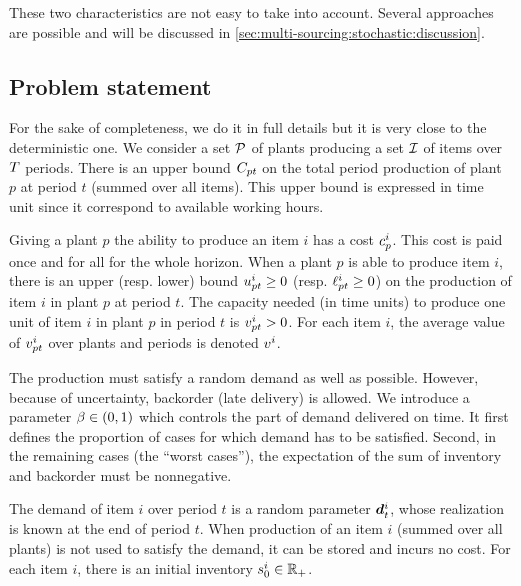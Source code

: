 These two characteristics are not easy to take into account.
Several approaches are possible and will be discussed in \cref{sec:multi-sourcing:stochastic:discussion}.



\subsection{Problem statement}
\label{sec:multi-sourcing:stochastic:introduction:problem-statement}


For the sake of completeness, we do it in full details but it is very close to the deterministic one.
We consider a set $\mathcal{P}$ of plants producing a set $\mathcal{I}$ of items over $T$ periods.
There is an upper bound $C_{pt}$ on the total period production of plant $p$ at period $t$ (summed over all items).
This upper bound is expressed in time unit since it correspond to available working hours.


Giving a plant $p$ the ability to produce an item $i$ has a cost $c_p^i$.
This cost is paid once and for all for the whole horizon.
When a plant $p$ is able to produce item $i$, there is an upper (resp. lower) bound $u_{pt}^i\ge 0$ (resp. $\ell_{pt}^i\ge 0$) on the production of item $i$ in plant $p$ at period $t$.
The capacity needed (in time units) to produce one unit of item $i$ in plant $p$ in period $t$ is $v_{pt}^i>0$.
For each item $i$, the average value of $v_{pt}^i$ over plants and periods is denoted $v^i$.


The production must satisfy a random demand as well as possible.
However, because of uncertainty, backorder (\ie late delivery) is allowed.
We introduce a parameter $\servicelvl\in\bracket{0,1}$ which controls the part of demand delivered on time.
It first defines the proportion of cases for which demand has to be satisfied.
Second, in the remaining cases (\ie the ``worst cases''), the expectation of the sum of inventory and backorder must be nonnegative.


The demand of item $i$ over period $t$ is a random parameter $\va\demand_t^i$, whose realization is known at the end of period $t$.
When production of an item $i$ (summed over all plants) is not used to satisfy the demand, it can be stored and incurs no cost.
For each item $i$, there is an initial inventory $s_0^i\in\mathbb{R}_+$.


